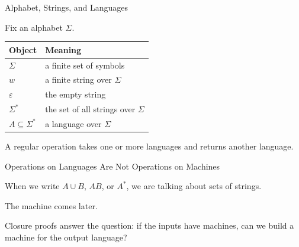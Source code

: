 \documentclass[10pt,aspectratio=169]{beamer}
\newcommand{\eps}{\varepsilon}
\begin{document}
\begin{frame}{Alphabet, Strings, and Languages}

Fix an alphabet $\Sigma$.

\vspace{0.7em}
\begin{table}
\centering
\begin{tabular}{ll}
\toprule
\textbf{Object} & \textbf{Meaning} \\
\midrule
$\Sigma$ & a finite set of symbols \\
$w$ & a finite string over $\Sigma$ \\
$\eps$ & the empty string \\
$\Sigma^*$ & the set of all strings over $\Sigma$ \\
$A \subseteq \Sigma^*$ & a language over $\Sigma$ \\
\bottomrule
\end{tabular}
\end{table}

\vspace{0.7em}
A regular operation takes one or more languages and returns another language.

\end{frame}

\begin{frame}{Operations on Languages Are Not Operations on Machines}

When we write $A \cup B$, $AB$, or $A^*$, we are talking about sets of strings.

\vspace{0.8em}
The machine comes later.

\vspace{0.8em}
\begin{center}
\end{center}

\vspace{0.8em}
Closure proofs answer the question: if the inputs have machines, can we build a machine for the output language?

\end{frame}
\end{document}

